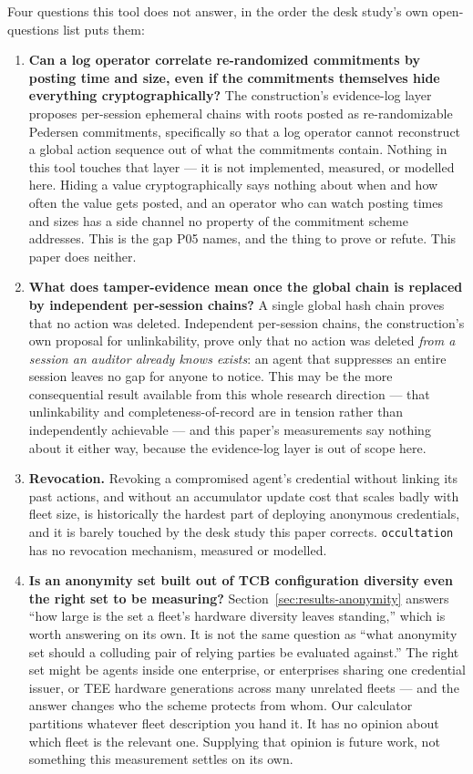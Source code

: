\documentclass[11pt]{article}
\newcommand{\occultation}{\texttt{occultation}}
\begin{document}
Four questions this tool does not answer, in the order the desk study's own
open-questions list puts them:

\begin{enumerate}[itemsep=3pt,topsep=3pt]

\item \textbf{Can a log operator correlate re-randomized commitments by
posting time and size, even if the commitments themselves hide everything
cryptographically?} The construction's evidence-log layer proposes
per-session ephemeral chains with roots posted as re-randomizable Pedersen
commitments, specifically so that a log operator cannot reconstruct a global
action sequence out of what the commitments contain. Nothing in this tool
touches that layer --- it is not implemented, measured, or modelled here.
Hiding a value cryptographically says nothing about when and how often the
value gets posted, and an operator who can watch posting times and sizes has
a side channel no property of the commitment scheme addresses. This is the
gap P05 names, and the thing to prove or refute. This paper does neither.

\item \textbf{What does tamper-evidence mean once the global chain is
replaced by independent per-session chains?} A single global hash chain
proves that no action was deleted. Independent per-session chains, the
construction's own proposal for unlinkability, prove only that no action was
deleted \emph{from a session an auditor already knows exists}: an agent that
suppresses an entire session leaves no gap for anyone to notice. This may be
the more consequential result available from this whole research direction
--- that unlinkability and completeness-of-record are in tension rather than
independently achievable --- and this paper's measurements say nothing about
it either way, because the evidence-log layer is out of scope here.

\item \textbf{Revocation.} Revoking a compromised agent's credential without
linking its past actions, and without an accumulator update cost that scales
badly with fleet size, is historically the hardest part of deploying
anonymous credentials, and it is barely touched by the desk study this paper
corrects. \occultation{} has no revocation mechanism, measured or modelled.

\item \textbf{Is an anonymity set built out of TCB configuration diversity
even the right set to be measuring?} Section~\ref{sec:results-anonymity}
answers ``how large is the set a fleet's hardware diversity leaves
standing,'' which is worth answering on its own. It is not the same question
as ``what anonymity set should a colluding pair of relying parties be
evaluated against.'' The right set might be agents inside one enterprise, or
enterprises sharing one credential issuer, or TEE hardware generations across
many unrelated fleets --- and the answer changes who the scheme protects from
whom. Our calculator partitions whatever fleet description you hand it. It
has no opinion about which fleet is the relevant one. Supplying that opinion
is future work, not something this measurement settles on its own.


\end{enumerate}
\end{document}
